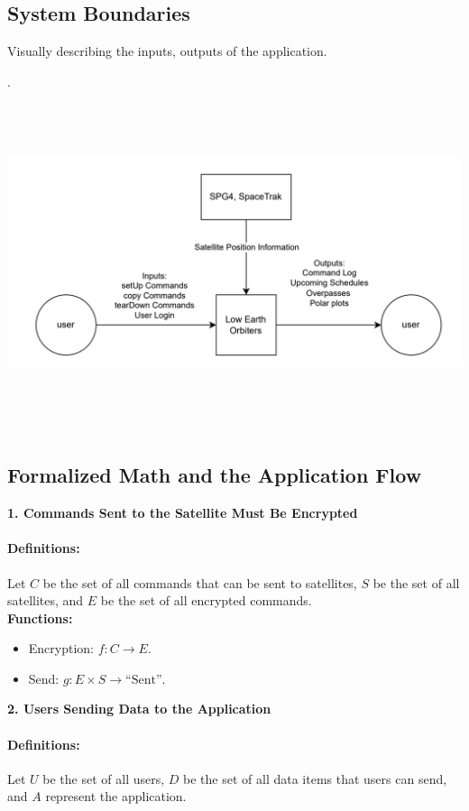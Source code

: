 \documentclass[12pt]{article}
\begin{document}
\subsection{System Boundaries}
Visually describing the inputs, outputs of the application. 

.\includegraphics[width=15cm, height=10cm]{systemcontext.png}

\subsection{Formalized Math and the Application Flow }
  
\textbf{1. Commands Sent to the Satellite Must Be Encrypted}

\paragraph{Definitions:}
Let $C$ be the set of all commands that can be sent to satellites, $S$ be the set of all satellites, and $E$ be the set of all encrypted commands.\\

\textbf{Functions:}
\begin{itemize}
  \item Encryption: $f : C \rightarrow E$.
  \item Send: $g : E \times S \rightarrow \text{``Sent''}$.
\end{itemize}

\textbf{2. Users Sending Data to the Application}

\paragraph{Definitions:}
Let $U$ be the set of all users, $D$ be the set of all data items that users can send, and $A$ represent the application.\\
\end{document}
